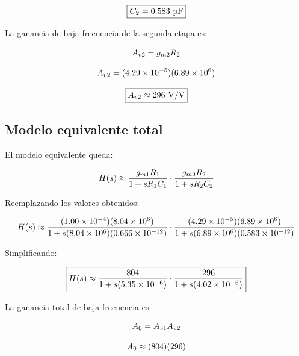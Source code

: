 \begin{equation}\notag
\boxed{
C_2=0.583\ \mathrm{pF}
}
\end{equation}

La ganancia de baja frecuencia de la segunda etapa es:

\begin{equation}\notag
A_{v2}=g_{m2}R_2
\end{equation}

\begin{equation}\notag
A_{v2}
=
(4.29\times 10^{-5})
(6.89\times 10^{6})
\end{equation}

\begin{equation}\notag
\boxed{
A_{v2}\approx 296\ \mathrm{V/V}
}
\end{equation}

\subsection*{Modelo equivalente total}

El modelo equivalente queda:

\begin{equation}\notag
H(s)\approx
\frac{g_{m1}R_1}{1+sR_1C_1}
\cdot
\frac{g_{m2}R_2}{1+sR_2C_2}
\end{equation}

Reemplazando los valores obtenidos:

\begin{equation}\notag
H(s)\approx
\frac{(1.00\times 10^{-4})(8.04\times 10^{6})}
{1+s(8.04\times 10^{6})(0.666\times 10^{-12})}
\cdot
\frac{(4.29\times 10^{-5})(6.89\times 10^{6})}
{1+s(6.89\times 10^{6})(0.583\times 10^{-12})}
\end{equation}

Simplificando:

\begin{equation}\notag
\boxed{
H(s)\approx
\frac{804}{1+s(5.35\times 10^{-6})}
\cdot
\frac{296}{1+s(4.02\times 10^{-6})}
}
\end{equation}

La ganancia total de baja frecuencia es:

\begin{equation}\notag
A_0=A_{v1}A_{v2}
\end{equation}

\begin{equation}\notag
A_0
\approx
(804)(296)
\end{equation}

